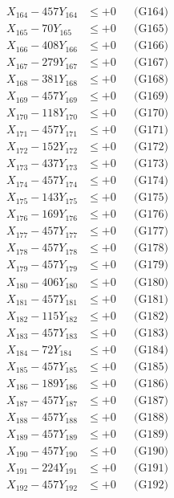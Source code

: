\documentclass[a4paper,10pt]{article}
\begin{document}
{\begin{align}
X_{164} - 457Y_{164} &\leq +0 && \text{(G164)} \\
X_{165} - 70Y_{165} &\leq +0 && \text{(G165)} \\
X_{166} - 408Y_{166} &\leq +0 && \text{(G166)} \\
X_{167} - 279Y_{167} &\leq +0 && \text{(G167)} \\
X_{168} - 381Y_{168} &\leq +0 && \text{(G168)} \\
X_{169} - 457Y_{169} &\leq +0 && \text{(G169)} \\
X_{170} - 118Y_{170} &\leq +0 && \text{(G170)} \\
\allowbreak
X_{171} - 457Y_{171} &\leq +0 && \text{(G171)} \\
X_{172} - 152Y_{172} &\leq +0 && \text{(G172)} \\
X_{173} - 437Y_{173} &\leq +0 && \text{(G173)} \\
X_{174} - 457Y_{174} &\leq +0 && \text{(G174)} \\
X_{175} - 143Y_{175} &\leq +0 && \text{(G175)} \\
X_{176} - 169Y_{176} &\leq +0 && \text{(G176)} \\
X_{177} - 457Y_{177} &\leq +0 && \text{(G177)} \\
X_{178} - 457Y_{178} &\leq +0 && \text{(G178)} \\
X_{179} - 457Y_{179} &\leq +0 && \text{(G179)} \\
X_{180} - 406Y_{180} &\leq +0 && \text{(G180)} \\
\allowbreak
X_{181} - 457Y_{181} &\leq +0 && \text{(G181)} \\
X_{182} - 115Y_{182} &\leq +0 && \text{(G182)} \\
X_{183} - 457Y_{183} &\leq +0 && \text{(G183)} \\
X_{184} - 72Y_{184} &\leq +0 && \text{(G184)} \\
X_{185} - 457Y_{185} &\leq +0 && \text{(G185)} \\
X_{186} - 189Y_{186} &\leq +0 && \text{(G186)} \\
X_{187} - 457Y_{187} &\leq +0 && \text{(G187)} \\
X_{188} - 457Y_{188} &\leq +0 && \text{(G188)} \\
X_{189} - 457Y_{189} &\leq +0 && \text{(G189)} \\
X_{190} - 457Y_{190} &\leq +0 && \text{(G190)} \\
\allowbreak
X_{191} - 224Y_{191} &\leq +0 && \text{(G191)} \\
X_{192} - 457Y_{192} &\leq +0 && \text{(G192)} \\

\end{align}}
\end{document}
